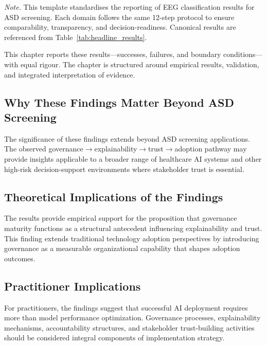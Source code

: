\vspace{2pt}
\noindent\textit{Note.} This template standardises the reporting of EEG classification results for ASD screening. Each domain follows the same 12-step protocol to ensure comparability, transparency, and decision-readiness. Canonical results are referenced from Table~\ref{tab:headline_results}.
\fi %
\fi %

\noindent This chapter reports these results---successes, failures, and boundary conditions---with equal rigour. The chapter is structured around empirical results, validation, and integrated interpretation of evidence.


\subsection{Why These Findings Matter Beyond ASD Screening}
\label{sec:why_findings_matter}

\noindent The significance of these findings extends beyond ASD screening applications. The observed governance$\rightarrow$explainability$\rightarrow$trust$\rightarrow$adoption pathway may provide insights applicable to a broader range of healthcare AI systems and other high-risk decision-support environments where stakeholder trust is essential.


\subsection{Theoretical Implications of the Findings}
\label{sec:theoretical_implications}

\noindent The results provide empirical support for the proposition that governance maturity functions as a structural antecedent influencing explainability and trust. This finding extends traditional technology adoption perspectives by introducing governance as a measurable organizational capability that shapes adoption outcomes.


\subsection{Practitioner Implications}
\label{sec:practitioner_implications}

\noindent For practitioners, the findings suggest that successful AI deployment requires more than model performance optimization. Governance processes, explainability mechanisms, accountability structures, and stakeholder trust-building activities should be considered integral components of implementation strategy.

